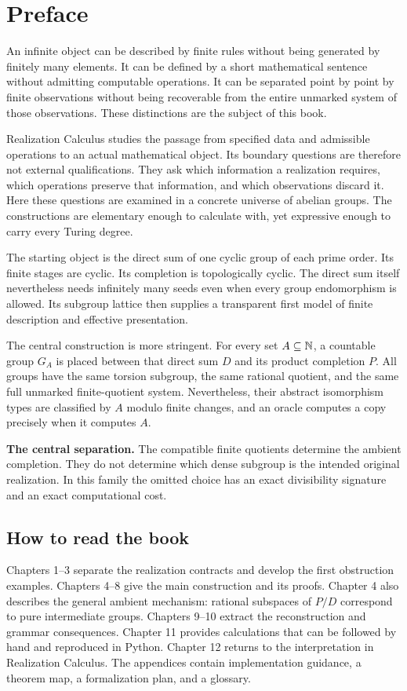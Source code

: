 \chapter*{Preface}
An infinite object can be described by finite rules without being generated by finitely many elements. It can be defined by a short mathematical sentence without admitting computable operations. It can be separated point by point by finite observations without being recoverable from the entire unmarked system of those observations. These distinctions are the subject of this book.

Realization Calculus studies the passage from specified data and admissible operations to an actual mathematical object. Its boundary questions are therefore not external qualifications. They ask which information a realization requires, which operations preserve that information, and which observations discard it. Here these questions are examined in a concrete universe of abelian groups. The constructions are elementary enough to calculate with, yet expressive enough to carry every Turing degree.

The starting object is the direct sum of one cyclic group of each prime order. Its finite stages are cyclic. Its completion is topologically cyclic. The direct sum itself nevertheless needs infinitely many seeds even when every group endomorphism is allowed. Its subgroup lattice then supplies a transparent first model of finite description and effective presentation.

The central construction is more stringent. For every set $A\subseteq\mathbb N$, a countable group $G_A$ is placed between that direct sum $D$ and its product completion $P$. All groups have the same torsion subgroup, the same rational quotient, and the same full unmarked finite-quotient system. Nevertheless, their abstract isomorphism types are classified by $A$ modulo finite changes, and an oracle computes a copy precisely when it computes $A$.

\begin{keybox}
\textbf{The central separation.} The compatible finite quotients determine the ambient completion. They do not determine which dense subgroup is the intended original realization. In this family the omitted choice has an exact divisibility signature and an exact computational cost.
\end{keybox}

\section*{How to read the book}
Chapters 1--3 separate the realization contracts and develop the first obstruction examples. Chapters 4--8 give the main construction and its proofs. Chapter 4 also describes the general ambient mechanism: rational subspaces of $P/D$ correspond to pure intermediate groups. Chapters 9--10 extract the reconstruction and grammar consequences. Chapter 11 provides calculations that can be followed by hand and reproduced in Python. Chapter 12 returns to the interpretation in Realization Calculus. The appendices contain implementation guidance, a theorem map, a formalization plan, and a glossary.

